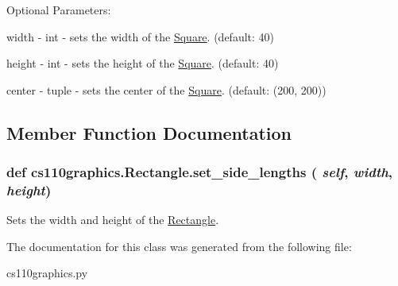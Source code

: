 Optional Parameters:
\begin{DoxyItemize}
\item width -\/ int -\/ sets the width of the \hyperlink{classcs110graphics_1_1Square}{Square}. (default: 40)
\item height -\/ int -\/ sets the height of the \hyperlink{classcs110graphics_1_1Square}{Square}. (default: 40)
\item center -\/ tuple -\/ sets the center of the \hyperlink{classcs110graphics_1_1Square}{Square}. (default: (200, 200)) 
\end{DoxyItemize}

\subsection{Member Function Documentation}
\hypertarget{classcs110graphics_1_1Rectangle_a080e6851b24278d7533e0fa9920ea036}{
\subsubsection[{set\_\-side\_\-lengths}]{\setlength{\rightskip}{0pt plus 5cm}def cs110graphics.Rectangle.set\_\-side\_\-lengths ( {\em self}, \/   {\em width}, \/   {\em height})}}
\label{classcs110graphics_1_1Rectangle_a080e6851b24278d7533e0fa9920ea036}


Sets the width and height of the \hyperlink{classcs110graphics_1_1Rectangle}{Rectangle}. 

The documentation for this class was generated from the following file:\begin{DoxyCompactItemize}
\item 
cs110graphics.py\end{DoxyCompactItemize}

